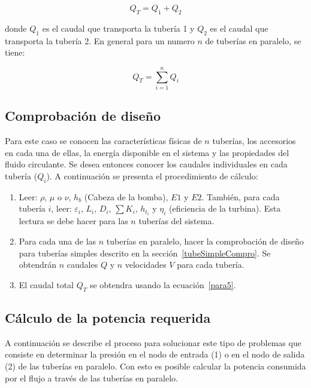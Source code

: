 \documentclass[10pt, oneside]{article}
\begin{document}
\begin{itemize}
\begin{equation}
Q_T = Q_1 + Q_2
\label{para4}
\end{equation}

donde $Q_1$ es el caudal que transporta la tuber\'ia 1 y $Q_2$ es el caudal que transporta la tuber\'ia 2. En general para un numero $n$ de tuber\'ias en paralelo, se tiene:

\begin{equation}
Q_T = \sum_{i=1}^n Q_i
\label{para5}
\end{equation}
\end{itemize}

\subsection{Comprobaci\'on de dise\~no} 
Para este caso se conocen las caracter\'isticas f\'isicas de $n$ tuber\'ias, los accesorios en cada una de ellas, la energ\'ia disponible en el sistema y las propiedades del fluido circulante. Se desea entonces conocer los caudales individuales en cada tuber\'ia ($Q_i$). A continuaci\'on se presenta el procedimiento de c\'alculo: 
\begin{enumerate}
\item Leer: $\rho$, $\mu$ o $\nu$, $h_{b}$ (Cabeza de la bomba), $E1$ y $E2$. Tambi\'en, para cada tuber\'ia $i$, leer: $\varepsilon_i$, $L_i$, $D_i$, $\sum K_i$, $h_{t_i}$ y $\eta_i$ (eficiencia de la turbina). Esta lectura se debe hacer para las $n$ tuber\'ias del sistema.
\item Para cada una de las $n$ tuber\'ias en paralelo, hacer la comprobaci\'on de dise\~no para tuber\'ias simples descrito en la secci\'on~\ref{tubeSimpleCompro}. Se obtendr\'an $n$ caudales $Q$ y $n$ velocidades $V$ para cada tuber\'ia. 
\item El caudal total $Q_T$ se obtendra usando la ecuaci\'on~\ref{para5}. 
\end{enumerate}

\subsection{C\'alculo de la potencia requerida}\label{tubeParallPoten}
A continuaci\'on se describe el proceso para solucionar este tipo de problemas que consiste en determinar la presi\'on en el nodo de entrada (1) o en el nodo de salida (2) de las tuber\'ias en paralelo. Con esto es posible calcular la potencia consumida por el flujo a trav\'es de las tuber\'ias en paralelo. 
\end{document}
